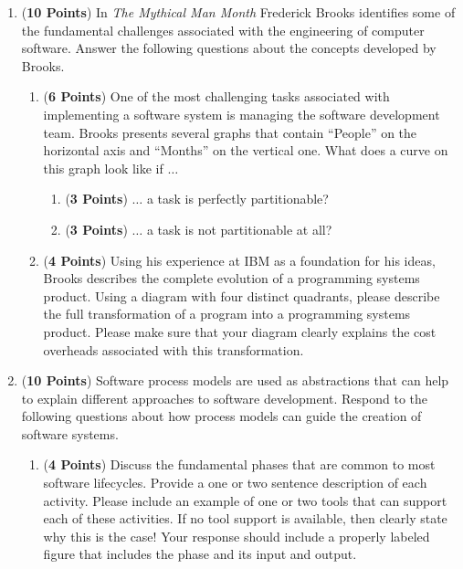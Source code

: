 \documentclass[12pt,epsf,psfig,graphics]{article}
\begin{document}
\begin{enumerate}
  
\item ({\bf 10 Points}) In {\em The Mythical Man Month} Frederick
  Brooks identifies some of the fundamental challenges associated with
  the engineering of computer software.  Answer the following
  questions about the concepts developed by Brooks.

  \begin{enumerate}
          
  \item ({\bf 6 Points}) One of the most challenging tasks associated
    with implementing a software system is managing the software
    development team.  Brooks presents several graphs that contain
    ``People'' on the horizontal axis and ``Months'' on the vertical
    one.  What does a curve on this graph look like if $\ldots$

    \begin{enumerate}

      \item ({\bf 3 Points}) $\ldots$ a task is perfectly partitionable?
    
      \item ({\bf 3 Points}) $\ldots$ a task is not partitionable at all?

    \end{enumerate}

  \item ({\bf 4 Points}) Using his experience at IBM as a foundation
    for his ideas, Brooks describes the complete evolution of a
    programming systems product.  Using a diagram with four distinct
    quadrants, please describe the full transformation of a program
    into a programming systems product.  Please make sure that your
    diagram clearly explains the cost overheads associated with this
    transformation.

  \end{enumerate}
        
\newpage

\item ({\bf 10 Points}) Software process models are used as
  abstractions that can help to explain different approaches to
  software development. Respond to the following questions about how
  process models can guide the creation of software systems.

        \begin{enumerate}
          
        \item ({\bf 4 Points}) Discuss the fundamental phases that
          are common to most software lifecycles.  Provide a one or two
          sentence description of each activity.  Please include an
          example of one or two tools that can support each of these
          activities. If no tool support is available, then clearly
          state why this is the case!  Your response should include a
          properly labeled figure that includes the phase and its
          input and output.
          

\end{enumerate}
\end{enumerate}
\end{document}
